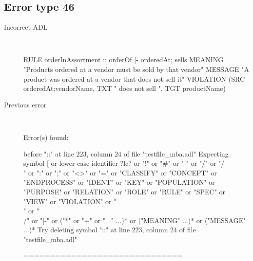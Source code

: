 \subsection{Error type 46}
  \begin{description}
  \item[Incorrect ADL]~\\
\begin{adl}
RULE orderInAssortment :: orderOf |- orderedAt; sells 
MEANING "Products ordered at a vendor must be sold by that vendor"
MESSAGE "A product was ordered at a vendor that does not sell it"
VIOLATION (SRC orderedAt;vendorName, TXT " does not sell ", TGT productName)\end{adl}
  \item[Previous error]~\\
\begin{haskell}
Error(s) found:

before "::" at line 223, column 24 of file "testfile_mba.adl"
Expecting symbol [ or lower case identifier ?lc? or "!" or "#" or "-" or "/" or
"/\\" or ":" or ";" or "<>" or "=" or "CLASSIFY" or "CONCEPT" or "ENDPROCESS" or
 "IDENT" or "KEY" or "POPULATION" or "PURPOSE" or "RELATION" or "ROLE" or "RULE"
 or "SPEC" or "VIEW" or "VIOLATION" or "\\" or "\\/" or "|-" or ("*" or "+" or "
~" ...)* or ("MEANING" ...)* or ("MESSAGE" ...)*
Try deleting symbol "::" at line 223, column 24 of file "testfile_mba.adl"

==============================


\end{haskell}
\end{description}
